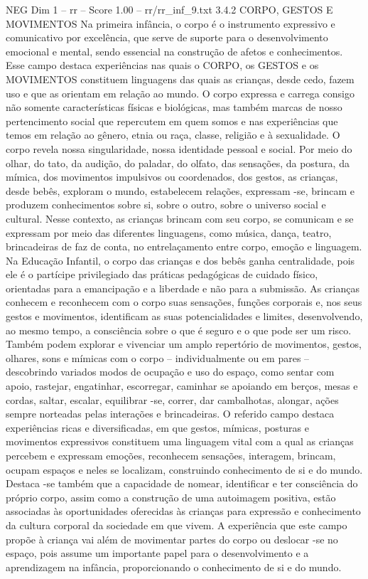 \begin{textsample}{NEG Dim 1 – rr – Score 1.00 – rr/rr\_inf\_9.txt}  \label{ex:f1_neg_071}
3.4.2 CORPO, GESTOS E MOVIMENTOS Na primeira infância, o corpo é o instrumento expressivo e comunicativo por excelência, que serve de suporte para o desenvolvimento emocional e mental, sendo essencial na construção de afetos e conhecimentos.
Esse campo destaca experiências nas quais o CORPO, os GESTOS e os MOVIMENTOS constituem linguagens das quais as crianças, desde cedo, fazem uso e que as orientam em relação ao mundo.
O corpo expressa e carrega consigo não somente características físicas e biológicas, mas também marcas de nosso pertencimento social que repercutem em quem somos e nas experiências que temos em relação ao gênero, etnia ou raça, classe, religião e à sexualidade.
O corpo revela nossa singularidade, nossa identidade pessoal e social.
Por meio do olhar, do tato, da audição, do paladar, do olfato, das sensações, da postura, da mímica, dos movimentos impulsivos ou coordenados, dos gestos, as crianças, desde bebês, exploram o mundo, estabelecem relações, expressam -se, brincam e produzem conhecimentos sobre si, sobre o outro, sobre o universo social e cultural.
Nesse contexto, as crianças brincam com seu corpo, se comunicam e se expressam por meio das diferentes linguagens, como música, dança, teatro, brincadeiras de faz de conta, no entrelaçamento entre corpo, emoção e linguagem.
Na Educação Infantil, o corpo das crianças e dos bebês ganha centralidade, pois ele é o partícipe privilegiado das práticas pedagógicas de cuidado físico, orientadas para a emancipação e a liberdade e não para a submissão.
As crianças conhecem e reconhecem com o corpo suas sensações, funções corporais e, nos seus gestos e movimentos, identificam as suas potencialidades e limites, desenvolvendo, ao mesmo tempo, a consciência sobre o que é seguro e o que pode ser um risco.
Também podem explorar e vivenciar um amplo repertório de movimentos, gestos, olhares, sons e mímicas com o corpo – individualmente ou em pares – descobrindo variados modos de ocupação e uso do espaço, como sentar com apoio, rastejar, engatinhar, escorregar, caminhar se apoiando em berços, mesas e cordas, saltar, escalar, equilibrar -se, correr, dar cambalhotas, alongar, ações sempre norteadas pelas interações e brincadeiras.
O referido campo destaca experiências ricas e diversificadas, em que gestos, mímicas, posturas e movimentos expressivos constituem uma linguagem vital com a qual as crianças percebem e expressam emoções, reconhecem sensações, interagem, brincam, ocupam espaços e neles se localizam, construindo conhecimento de si e do mundo.
Destaca -se também que a capacidade de nomear, identificar e ter consciência do próprio corpo, assim como a construção de uma autoimagem positiva, estão associadas às oportunidades oferecidas às crianças para expressão e conhecimento da cultura corporal da sociedade em que vivem.
A experiência que este campo propõe à criança vai além de movimentar partes do corpo ou deslocar -se no espaço, pois assume um importante papel para o desenvolvimento e a aprendizagem na infância, proporcionando o conhecimento de si e do mundo.

\end{textsample}
